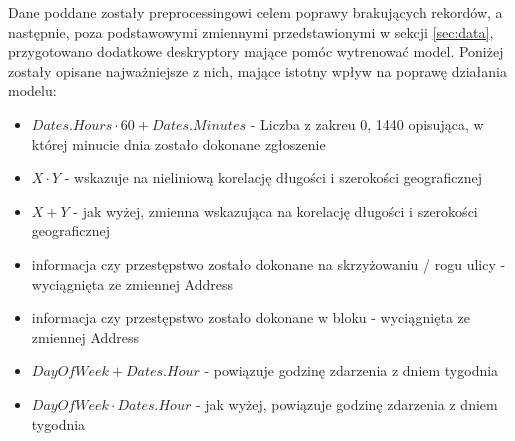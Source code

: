 \documentclass[11pt]{article} %
\begin{document}
Dane poddane zostały preprocessingowi celem poprawy brakujących rekordów, a następnie, poza podstawowymi zmiennymi przedstawionymi w sekcji \ref{sec:data}, przygotowano dodatkowe deskryptory mające pomóc wytrenować model. Poniżej zostały opisane najważniejsze z nich, mające istotny wpływ na poprawę działania modelu:

\begin{itemize}
\item $Dates.Hours \cdot 60 + Dates.Minutes$ - Liczba z zakreu {0, 1440} opisująca, w której minucie dnia zostało dokonane zgłoszenie

\item $X \cdot Y$ - wskazuje na nieliniową korelację długości i szerokości geograficznej

\item $X + Y$ - jak wyżej, zmienna wskazująca na korelację długości i szerokości geograficznej

\item informacja czy przestępstwo zostało dokonane na skrzyżowaniu / rogu ulicy - wyciągnięta ze zmiennej Address

\item informacja czy przestępstwo zostało dokonane w bloku - wyciągnięta ze zmiennej Address

\item $DayOfWeek + Dates.Hour$  - powiązuje godzinę zdarzenia z dniem tygodnia

\item $DayOfWeek \cdot Dates.Hour$ -  jak wyżej, powiązuje godzinę zdarzenia z dniem tygodnia

\end{itemize}
\end{document}
